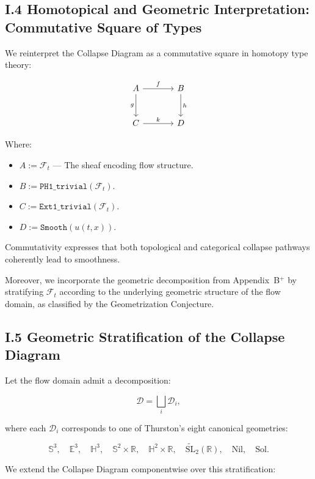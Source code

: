 \documentclass[11pt]{article}
\begin{document}
\subsection*{I.4 Homotopical and Geometric Interpretation: Commutative Square of Types}

We reinterpret the Collapse Diagram as a commutative square in homotopy type theory:

\[
\begin{tikzcd}[row sep=large, column sep=large]
A
  \arrow[r, "f"]
  \arrow[d, "g"']
& B
  \arrow[d, "h"] \\
C
  \arrow[r, "k"]
& D
\end{tikzcd}
\]

Where:

\begin{itemize}
  \item \( A := \mathcal{F}_t \) — The sheaf encoding flow structure.
  \item \( B := \texttt{PH1\_trivial}(\mathcal{F}_t) \).
  \item \( C := \texttt{Ext1\_trivial}(\mathcal{F}_t) \).
  \item \( D := \texttt{Smooth}(u(t, x)) \).
\end{itemize}

Commutativity expresses that both topological and categorical collapse pathways coherently lead to smoothness.

Moreover, we incorporate the geometric decomposition from Appendix~B$^+$ by stratifying \( \mathcal{F}_t \) according to the underlying geometric structure of the flow domain, as classified by the Geometrization Conjecture.

\subsection*{I.5 Geometric Stratification of the Collapse Diagram}

Let the flow domain admit a decomposition:

\[
\mathcal{D} = \bigsqcup_i \mathcal{D}_i,
\]

where each \( \mathcal{D}_i \) corresponds to one of Thurston's eight canonical geometries:

\[
\mathbb{S}^3, \quad \mathbb{E}^3, \quad \mathbb{H}^3, \quad \mathbb{S}^2 \times \mathbb{R}, \quad \mathbb{H}^2 \times \mathbb{R}, \quad \widetilde{\mathrm{SL}}_2(\mathbb{R}), \quad \mathrm{Nil}, \quad \mathrm{Sol}.
\]

We extend the Collapse Diagram componentwise over this stratification:
\end{document}
